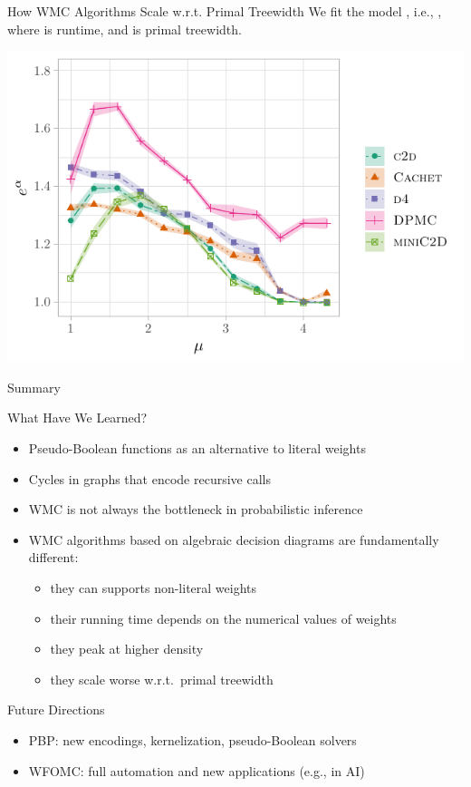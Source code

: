\documentclass{beamer}
\begin{document}
 \begin{frame}{How WMC Algorithms Scale w.r.t. Primal Treewidth}
  We fit the model , i.e.,
  , where  is
  \alert{runtime}, and  is \alert{primal treewidth}.

  \centering
  \includegraphics{linearbase.pdf}
\end{frame}

\begin{frame}{Summary}
  \begin{block}{What Have We Learned?}
    \begin{itemize}
      \item Pseudo-Boolean functions as an alternative to literal weights
      \item Cycles in graphs that encode recursive calls
      \item WMC is not always the bottleneck in probabilistic inference
      \item WMC algorithms based on algebraic decision diagrams are fundamentally different:
      \begin{itemize}
        \item they can supports non-literal weights
        \item their running time depends on the numerical values of weights
        \item they peak at higher density
        \item they scale worse w.r.t.\ primal treewidth
      \end{itemize}
    \end{itemize}
  \end{block}
  \begin{block}{Future Directions}
    \begin{itemize}
      \item PBP\@: new encodings, kernelization, pseudo-Boolean solvers
      \item WFOMC\@: full automation and new applications (e.g., in AI)
    \end{itemize}
  \end{block}
\end{frame}
\end{document}
